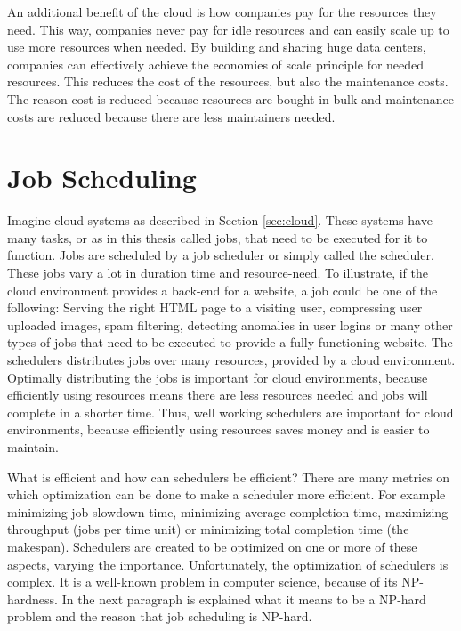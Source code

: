An additional benefit of the cloud is how companies pay for the resources they
need. This way, companies never pay for idle resources and can easily scale up
to use more resources when needed. By building and sharing huge data centers,
companies can effectively achieve the economies of scale principle for needed
resources. This reduces the cost of the resources, but also the maintenance
costs. The reason cost is reduced because resources are bought in bulk and
maintenance costs are reduced because there are less maintainers needed.

\section{Job Scheduling}\label{sec:scheduling}

Imagine cloud systems as described in Section \ref{sec:cloud}. These systems
have many tasks, or as in this thesis called jobs, that need to be executed
for it to function. Jobs are scheduled by a job scheduler or simply called the
scheduler. These jobs vary a lot in duration time and resource-need. To
illustrate, if the cloud environment provides a back-end for a website, a job
could be one of the following: Serving the right HTML page to a visiting user,
compressing user uploaded images, spam filtering, detecting anomalies in user
logins or many other types of jobs that need to be executed to provide a fully
functioning website. The schedulers distributes jobs over many resources,
provided by a cloud environment. Optimally distributing the jobs is important
for cloud environments, because efficiently using resources means there are
less resources needed and jobs will complete in a shorter time. Thus, well
working schedulers are important for cloud environments, because efficiently
using resources saves money and is easier to maintain.

What is efficient and how can schedulers be efficient? There are many metrics
on which optimization can be done to make a scheduler more efficient. For
example minimizing job slowdown time, minimizing average completion time,
maximizing throughput (jobs per time unit) or minimizing total completion time
(the makespan). Schedulers are created to be optimized on one or more of these
aspects, varying the importance. Unfortunately, the optimization of schedulers
is complex. It is a well-known problem in computer science, because of its
NP-hardness. In the next paragraph is explained what it means to be a NP-hard
problem and the reason that job scheduling is NP-hard.


